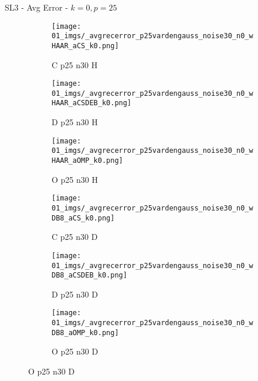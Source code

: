 \begin{frame}{SL3 - Avg Error - $k=0,p=25$}{}
\begin{figure}
\vspace{5pt}

\begin{subfigure}{0.13\textwidth}
\texttt{[image: 01\_imgs/\_avgrecerror\_p25vardengauss\_noise30\_n0\_wHAAR\_aCS\_k0.png]}
\caption*{\tiny C p25 n30 H}
\end{subfigure}
\begin{subfigure}{0.13\textwidth}
\texttt{[image: 01\_imgs/\_avgrecerror\_p25vardengauss\_noise30\_n0\_wHAAR\_aCSDEB\_k0.png]}
\caption*{\tiny D p25 n30 H}
\end{subfigure}
\begin{subfigure}{0.13\textwidth}
\texttt{[image: 01\_imgs/\_avgrecerror\_p25vardengauss\_noise30\_n0\_wHAAR\_aOMP\_k0.png]}
\caption*{\tiny O p25 n30 H}
\end{subfigure}
\begin{subfigure}{0.13\textwidth}
\texttt{[image: 01\_imgs/\_avgrecerror\_p25vardengauss\_noise30\_n0\_wDB8\_aCS\_k0.png]}
\caption*{\tiny C p25 n30 D}
\end{subfigure}
\begin{subfigure}{0.13\textwidth}
\texttt{[image: 01\_imgs/\_avgrecerror\_p25vardengauss\_noise30\_n0\_wDB8\_aCSDEB\_k0.png]}
\caption*{\tiny D p25 n30 D}
\end{subfigure}
\begin{subfigure}{0.13\textwidth}
\texttt{[image: 01\_imgs/\_avgrecerror\_p25vardengauss\_noise30\_n0\_wDB8\_aOMP\_k0.png]}
\caption*{\tiny O p25 n30 D}
\end{subfigure}
\end{figure}
\end{frame}

